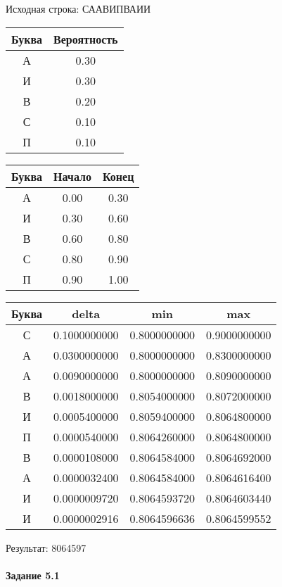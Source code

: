 \documentclass[a4paper, 12pt]{article}
\begin{document}
Исходная строка: СААВИПВАИИ\
\begin{center}
 \begin{tabular}{ |c|c| } 
  \hline
     Буква & Вероятность \\ \hline
А & 0.30\\\hline
И & 0.30\\\hline
В & 0.20\\\hline
С & 0.10\\\hline
П & 0.10
\\ \hline \end{tabular}
\end{center}
\begin{center}
 \begin{tabular}{ |c|c|c| } 
  \hline
     Буква & Начало & Конец \\ \hline
А & 0.00 & 0.30\\\hline
И & 0.30 & 0.60\\\hline
В & 0.60 & 0.80\\\hline
С & 0.80 & 0.90\\\hline
П & 0.90 & 1.00
\\ \hline \end{tabular}
\end{center}
\begin{center}
 \begin{tabular}{ |c|c|c|c| } 
  \hline
     Буква & delta & min & max \\ \hline
С & 0.1000000000 & 0.8000000000 & 0.9000000000\\\hline
А & 0.0300000000 & 0.8000000000 & 0.8300000000\\\hline
А & 0.0090000000 & 0.8000000000 & 0.8090000000\\\hline
В & 0.0018000000 & 0.8054000000 & 0.8072000000\\\hline
И & 0.0005400000 & 0.8059400000 & 0.8064800000\\\hline
П & 0.0000540000 & 0.8064260000 & 0.8064800000\\\hline
В & 0.0000108000 & 0.8064584000 & 0.8064692000\\\hline
А & 0.0000032400 & 0.8064584000 & 0.8064616400\\\hline
И & 0.0000009720 & 0.8064593720 & 0.8064603440\\\hline
И & 0.0000002916 & 0.8064596636 & 0.8064599552
\\ \hline \end{tabular}
\end{center}
Результат: 8064597
\pagebreak
\paragraph{Задание 5.1}
\end{document}
